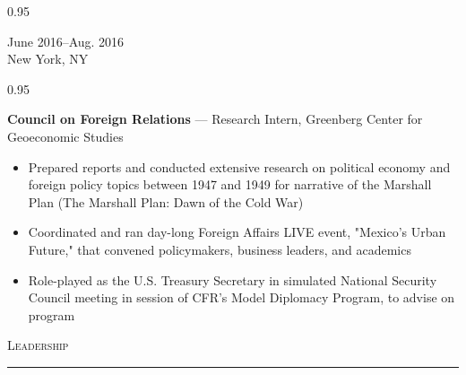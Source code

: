 \documentclass[a4paper,9pt]{article}
\newcommand{\mainMarginBottom}{\vspace*{1.5pt}}
\newcommand{\newLine}{\\}
\newcommand{\doubleColumnGap}{\hspace{4mm}}
\newcommand{\sectionMarginTopBottom}{\vspace*{9pt}}
\newcommand{\sectionMarginBetweenRemove}{\vspace{-5ex}}
\newcommand{\sectionMarginBetweenAdd}{\vspace{20pt}}
\newcommand{\mainLineSpacing}{0.95}
\def\hrulefill{\leavevmode\leaders\hrule height 1.75pt\hfill\kern0pt}
\begin{document}
\begin{minipage}[t]{0.20\linewidth}
  \begin{small}
    \begin{spacing}\mainLineSpacing{}
      \begin{flushright}
        June 2016--Aug. 2016
        \newLine{}
        \mainMarginBottom{}
        New York, NY
      \end{flushright}
    \end{spacing}
  \end{small}
\end{minipage}
\doubleColumnGap{}
\begin{minipage}[t]{0.75\linewidth}
  \begin{small}
    \begin{spacing}\mainLineSpacing{}
      \begin{flushleft}
        \textbf{Council on Foreign Relations} --- Research Intern, Greenberg Center for Geoeconomic Studies
        \mainMarginBottom{}
        \begin{itemize}[itemsep=0pt,topsep=0pt,leftmargin=*]
          \item Prepared reports and conducted extensive research on political economy and foreign policy topics between 1947 and 1949 for narrative of the Marshall Plan (The Marshall Plan: Dawn of the Cold War)
          \item Coordinated and ran day-long Foreign Affairs LIVE event, "Mexico's Urban Future," that convened policymakers, business leaders, and academics
          \item Role-played as the U.S. Treasury Secretary in simulated National Security Council meeting in session of CFR's Model Diplomacy Program, to advise on program
        \end{itemize}
      \end{flushleft}
    \end{spacing}
  \end{small}
\end{minipage}

\sectionMarginBetweenRemove{}
\sectionMarginBetweenAdd{}

\hspace*{11pt}\textsc{\fontsize{20}{24}\selectfont Leadership}\hspace*{14pt}\hrulefill
\sectionMarginTopBottom{}
\end{document}
